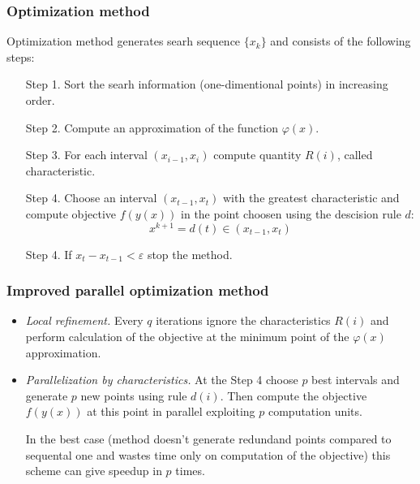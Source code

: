 \documentclass[aspectratio=1610]{beamer}
\begin{document}
\begin{frame}
  \frametitle{Optimization method}
Optimization method generates searh sequence \(\{x_k\}\) and consists of the following steps:
\begin{enumerate}
  \setlength{\itemindent}{.1in}
  \item[Step 1.] Sort the searh information (one-dimentional points) in increasing order.
  \item[Step 2.] Compute an approximation of the function \(\varphi(x)\).
  \item[Step 3.] For each interval \((x_{i-1}, x_i)\) compute quantity \(R(i)\), called characteristic.
  \item[Step 4.] Choose an interval \((x_{t-1}, x_t)\) with the greatest characteristic and
  compute objective \(f(y(x))\) in the point choosen using the descision rule \(d\):
  \begin{displaymath}
    x^{k+1}=d(t)\in (x_{t-1}, x_t)
  \end{displaymath}
  \item[Step 4.] If \(x_{t}-x_{t-1}<\varepsilon\) stop the method.
\end{enumerate}
\end{frame}

\begin{frame}
  \frametitle{Improved parallel optimization method}
  \begin{itemize}
    \item
    \textit{Local refinement.} Every \(q\) iterations ignore the characteristics \(R(i)\)
    and perform calculation of the objective at the minimum point of the \(\varphi(x)\) approximation.
    \item
    \textit{Parallelization by characteristics.} At the Step 4 choose \(p\) best intervals
    and generate \(p\) new points using rule \(d(i)\). Then compute the objective \(f(y(x))\) at this
    point in parallel exploiting \(p\) computation units.

    \enspace
    In the best case (method doesn't generate redundand points compared to sequental
    one and wastes time only on computation of the objective)
    this scheme can give speedup in \(p\) times.
  \end{itemize}

\end{frame}
\end{document}
